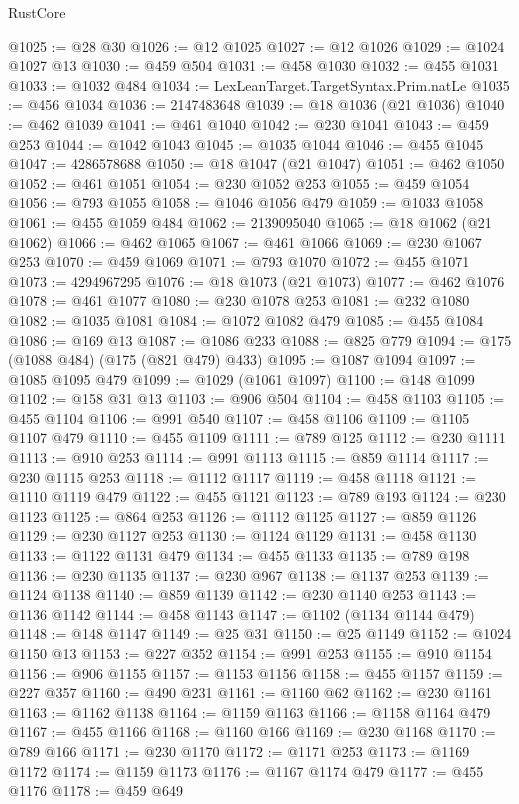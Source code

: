 \begin{lexlean}{RustCore}
\begin{coremodule}
@1025 := @28 @30
@1026 := @12 @1025
@1027 := @12 @1026
@1029 := @1024 @1027 @13
@1030 := @459 @504
@1031 := @458 @1030
@1032 := @455 @1031
@1033 := @1032 @484
@1034 := LexLeanTarget.TargetSyntax.Prim.natLe
@1035 := @456 @1034
@1036 := 2147483648
@1039 := @18 @1036 (@21 @1036)
@1040 := @462 @1039
@1041 := @461 @1040
@1042 := @230 @1041
@1043 := @459 @253
@1044 := @1042 @1043
@1045 := @1035 @1044
@1046 := @455 @1045
@1047 := 4286578688
@1050 := @18 @1047 (@21 @1047)
@1051 := @462 @1050
@1052 := @461 @1051
@1054 := @230 @1052 @253
@1055 := @459 @1054
@1056 := @793 @1055
@1058 := @1046 @1056 @479
@1059 := @1033 @1058
@1061 := @455 @1059 @484
@1062 := 2139095040
@1065 := @18 @1062 (@21 @1062)
@1066 := @462 @1065
@1067 := @461 @1066
@1069 := @230 @1067 @253
@1070 := @459 @1069
@1071 := @793 @1070
@1072 := @455 @1071
@1073 := 4294967295
@1076 := @18 @1073 (@21 @1073)
@1077 := @462 @1076
@1078 := @461 @1077
@1080 := @230 @1078 @253
@1081 := @232 @1080
@1082 := @1035 @1081
@1084 := @1072 @1082 @479
@1085 := @455 @1084
@1086 := @169 @13
@1087 := @1086 @233
@1088 := @825 @779
@1094 := @175 (@1088 @484) (@175 (@821 @479) @433)
@1095 := @1087 @1094
@1097 := @1085 @1095 @479
@1099 := @1029 (@1061 @1097)
@1100 := @148 @1099
@1102 := @158 @31 @13
@1103 := @906 @504
@1104 := @458 @1103
@1105 := @455 @1104
@1106 := @991 @540
@1107 := @458 @1106
@1109 := @1105 @1107 @479
@1110 := @455 @1109
@1111 := @789 @125
@1112 := @230 @1111
@1113 := @910 @253
@1114 := @991 @1113
@1115 := @859 @1114
@1117 := @230 @1115 @253
@1118 := @1112 @1117
@1119 := @458 @1118
@1121 := @1110 @1119 @479
@1122 := @455 @1121
@1123 := @789 @193
@1124 := @230 @1123
@1125 := @864 @253
@1126 := @1112 @1125
@1127 := @859 @1126
@1129 := @230 @1127 @253
@1130 := @1124 @1129
@1131 := @458 @1130
@1133 := @1122 @1131 @479
@1134 := @455 @1133
@1135 := @789 @198
@1136 := @230 @1135
@1137 := @230 @967
@1138 := @1137 @253
@1139 := @1124 @1138
@1140 := @859 @1139
@1142 := @230 @1140 @253
@1143 := @1136 @1142
@1144 := @458 @1143
@1147 := @1102 (@1134 @1144 @479)
@1148 := @148 @1147
@1149 := @25 @31
@1150 := @25 @1149
@1152 := @1024 @1150 @13
@1153 := @227 @352
@1154 := @991 @253
@1155 := @910 @1154
@1156 := @906 @1155
@1157 := @1153 @1156
@1158 := @455 @1157
@1159 := @227 @357
@1160 := @490 @231
@1161 := @1160 @62
@1162 := @230 @1161
@1163 := @1162 @1138
@1164 := @1159 @1163
@1166 := @1158 @1164 @479
@1167 := @455 @1166
@1168 := @1160 @166
@1169 := @230 @1168
@1170 := @789 @166
@1171 := @230 @1170
@1172 := @1171 @253
@1173 := @1169 @1172
@1174 := @1159 @1173
@1176 := @1167 @1174 @479
@1177 := @455 @1176
@1178 := @459 @649

\end{coremodule}
\end{lexlean}
